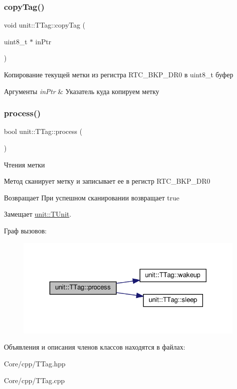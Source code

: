 \subsubsection{\texorpdfstring{copy\+Tag()}{copyTag()}}
{\footnotesize\ttfamily void unit\+::\+T\+Tag\+::copy\+Tag (\begin{DoxyParamCaption}\item[{uint8\+\_\+t $\ast$}]{in\+Ptr }\end{DoxyParamCaption})}



Копирование текущей метки из регистра R\+T\+C\+\_\+\+B\+K\+P\+\_\+\+D\+R0 в uint8\+\_\+t буфер 



 
\begin{DoxyParams}{Аргументы}
{\em in\+Ptr} & Указатель куда копируем метку \\
\hline
\end{DoxyParams}
\mbox{\label{classunit_1_1_t_tag_a1dfd588909730d0b48edbeda273526fe}} 
\subsubsection{\texorpdfstring{process()}{process()}}
{\footnotesize\ttfamily bool unit\+::\+T\+Tag\+::process (\begin{DoxyParamCaption}{ }\end{DoxyParamCaption})\hspace{0.3cm}{\ttfamily [virtual]}}



Чтения метки 

Метод сканирует метку и записывает ее в регистр R\+T\+C\+\_\+\+B\+K\+P\+\_\+\+D\+R0 \begin{DoxyReturn}{Возвращает}
При успешном сканировании возвращает true 
\end{DoxyReturn}


Замещает \hyperlink{classunit_1_1_t_unit_a108691c8b988d97c65237c83a31db706}{unit\+::\+T\+Unit}.

Граф вызовов\+:\nopagebreak
\begin{figure}[H]
\begin{center}
\leavevmode
\includegraphics[width=318pt]{classunit_1_1_t_tag_a1dfd588909730d0b48edbeda273526fe_cgraph}
\end{center}
\end{figure}


Объявления и описания членов классов находятся в файлах\+:\begin{DoxyCompactItemize}
\item 
Core/cpp/T\+Tag.\+hpp\item 
Core/cpp/T\+Tag.\+cpp\end{DoxyCompactItemize}
